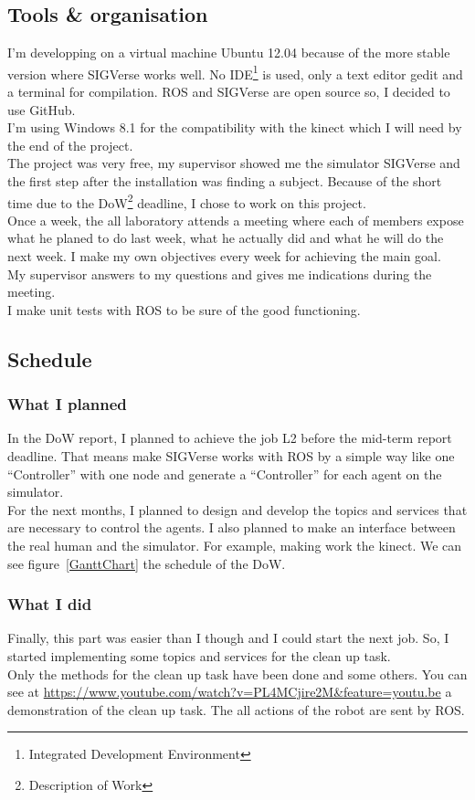 \subsection{Tools \& organisation}
I'm developping on a virtual machine Ubuntu 12.04 because of the more stable version where SIGVerse works well. No IDE\footnote{Integrated Development Environment} is used, only a text editor gedit and a terminal for compilation. ROS and SIGVerse are open source so, I decided to use GitHub.\\ 
I'm using Windows 8.1 for the compatibility with the kinect which I will need by the end of the project.\\

The project was very free, my supervisor showed me the simulator SIGVerse and the first step after the installation was finding a subject. Because of the short time due to the DoW\footnote{Description of Work} deadline, I chose to work on this project.\\

Once a week, the all laboratory attends a meeting where each of members expose what he planed to do last week, what he actually did and what he will do the next week. I make my own objectives every week for achieving the main goal.\\
My supervisor answers to my questions and gives me indications during the meeting.\\

I make unit tests with ROS to be sure of the good functioning.

\subsection{Schedule}
\subsubsection{What I planned}
In the DoW report, I planned to achieve the job L2 before the mid-term report deadline. That means make SIGVerse works with ROS by a simple way like one ``Controller'' with one node and generate a ``Controller'' for each agent on the simulator.\\

For the next months, I planned to design and develop the topics and services that are necessary to control the agents. I also planned to make an interface between the real human and the simulator. For example, making work the kinect. We can see figure~\ref{GanttChart} the schedule of the DoW.
\subsubsection{What I did}
Finally, this part was easier than I though and I could start the next job. So, I started implementing some topics and services for the clean up task.\\
Only the methods for the clean up task have been done and some others. You can see at \url{https://www.youtube.com/watch?v=PL4MCjire2M&feature=youtu.be} a demonstration of the clean up task. The all actions of the robot are sent by ROS.\\

